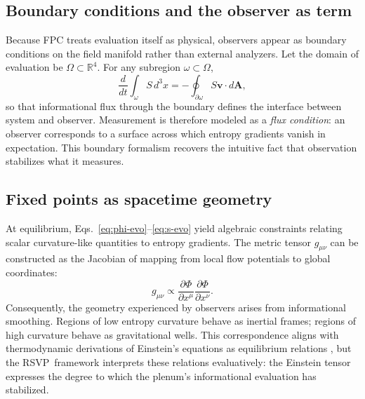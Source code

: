 \documentclass[12pt,a4paper]{article}
\newcommand{\Ph}{\Phi}                %
\newcommand{\Vv}{\mathbf{v}}          %
\newcommand{\Ss}{S}                   %
\newcommand{\RSVP}{RSVP}              %
\theoremstyle{plain}
\begin{document}
\subsection{Boundary conditions and the observer as term}
Because FPC treats evaluation itself as physical, observers appear as boundary conditions on the field manifold rather than external analyzers.
Let the domain of evaluation be \(\Omega\subset\mathbb{R}^4\).
For any subregion \(\omega\subset\Omega\),
\begin{equation}
\frac{d}{dt}\int_{\omega} \Ss\, d^3x
 = -\oint_{\partial\omega} \Ss \Vv\!\cdot\! d\mathbf{A},
\end{equation}
so that informational flux through the boundary defines the interface between system and observer.
Measurement is therefore modeled as a \emph{flux condition}:
an observer corresponds to a surface across which entropy gradients vanish in expectation.
This boundary formalism recovers the intuitive fact that observation stabilizes what it measures.

\subsection{Fixed points as spacetime geometry}
At equilibrium, Eqs.~\eqref{eq:phi-evo}--\eqref{eq:s-evo} yield algebraic constraints relating scalar curvature-like quantities to entropy gradients.
The metric tensor \(g_{\mu\nu}\) can be constructed as the Jacobian of mapping from local flow potentials to global coordinates:
\begin{equation}
g_{\mu\nu} \propto \frac{\partial \Ph}{\partial x^\mu}
                 \frac{\partial \Ph}{\partial x^\nu}.
\end{equation}
Consequently, the geometry experienced by observers arises from informational smoothing.
Regions of low entropy curvature behave as inertial frames; regions of high curvature behave as gravitational wells.
This correspondence aligns with thermodynamic derivations of Einstein’s equations as equilibrium relations \citep{jacobson1995thermodynamics,carney2023gravity}, but the \RSVP\ framework interprets these relations evaluatively: the Einstein tensor expresses the degree to which the plenum’s informational evaluation has stabilized.
\end{document}
